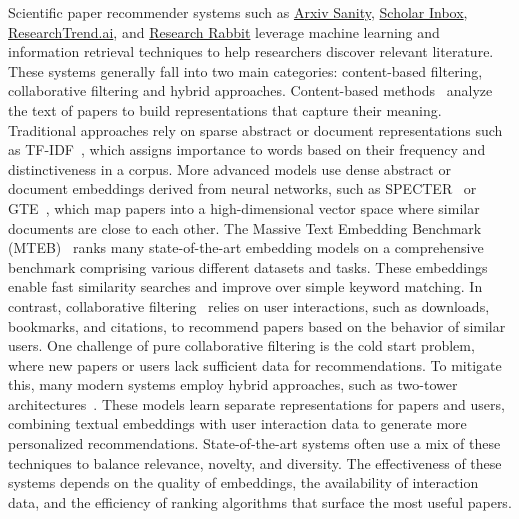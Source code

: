 Scientific paper recommender systems such as \href{https://arxiv-sanity-lite.com/}{Arxiv Sanity}, \href{https://www.scholar-inbox.com/}{Scholar Inbox}, \href{https://researchtrend.ai}{ResearchTrend.ai}, and \href{https://www.researchrabbit.ai/}{Research Rabbit} leverage machine learning and information retrieval techniques to help researchers discover relevant literature. These systems generally fall into two main categories: content-based filtering, collaborative filtering and hybrid approaches. Content-based methods~\cite{amami2016lda, bhagavatula-etal-2018-content} analyze the text of papers to build representations that capture their meaning. Traditional approaches rely on sparse abstract or document representations such as TF-IDF~\cite{sparck1972statistical}, which assigns importance to words based on their frequency and distinctiveness in a corpus. More advanced models use dense abstract or document embeddings derived from neural networks, such as SPECTER~\cite{cohan-etal-2020-specter} or GTE~\cite{li2023towards}, which map papers into a high-dimensional vector space where similar documents are close to each other. The Massive Text Embedding Benchmark (MTEB)~\cite{muennighoff-etal-2023-mteb} ranks many state-of-the-art embedding models on a comprehensive benchmark comprising various different datasets and tasks. These embeddings enable fast similarity searches and improve over simple keyword matching. In contrast, collaborative filtering~\cite{wang2014relational, bansal2016ask} relies on user interactions, such as downloads, bookmarks, and citations, to recommend papers based on the behavior of similar users. One challenge of pure collaborative filtering is the cold start problem, where new papers or users lack sufficient data for recommendations. To mitigate this, many modern systems employ hybrid approaches, such as two-tower architectures~\cite{10.1145/3298689.3346996, covington2016deep, yu2021dual}. These models learn separate representations for papers and users, combining textual embeddings with user interaction data to generate more personalized recommendations. State-of-the-art systems often use a mix of these techniques to balance relevance, novelty, and diversity. The effectiveness of these systems depends on the quality of embeddings, the availability of interaction data, and the efficiency of ranking algorithms that surface the most useful papers.


